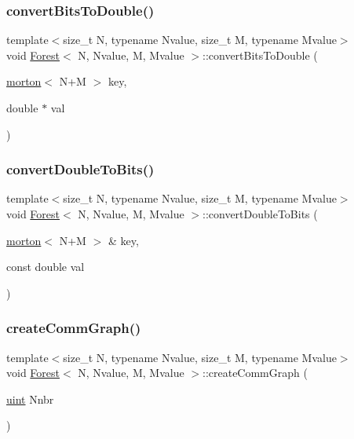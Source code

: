 \mbox{\label{classForest_a37b60e74ca7bb1cdf4ecbb9cc693ce63}} 
\subsubsection{\texorpdfstring{convert\+Bits\+To\+Double()}{convertBitsToDouble()}}
{\footnotesize\ttfamily template$<$size\+\_\+t N, typename Nvalue, size\+\_\+t M, typename Mvalue$>$ \\
void \mbox{\hyperlink{classForest}{Forest}}$<$ N, Nvalue, M, Mvalue $>$\+::convert\+Bits\+To\+Double (\begin{DoxyParamCaption}\item[{\mbox{\hyperlink{definitions_8h_af8682350bd8bb38ee9023f7a0a310add}{morton}}$<$ N+M $>$}]{key,  }\item[{double $\ast$}]{val }\end{DoxyParamCaption})}

\mbox{\label{classForest_a6648461dfcb06501a61872e34a350769}} 
\subsubsection{\texorpdfstring{convert\+Double\+To\+Bits()}{convertDoubleToBits()}}
{\footnotesize\ttfamily template$<$size\+\_\+t N, typename Nvalue, size\+\_\+t M, typename Mvalue$>$ \\
void \mbox{\hyperlink{classForest}{Forest}}$<$ N, Nvalue, M, Mvalue $>$\+::convert\+Double\+To\+Bits (\begin{DoxyParamCaption}\item[{\mbox{\hyperlink{definitions_8h_af8682350bd8bb38ee9023f7a0a310add}{morton}}$<$ N+M $>$ \&}]{key,  }\item[{const double}]{val }\end{DoxyParamCaption})}

\mbox{\label{classForest_a6a12247ec2f9ae36f657c2abf63b9364}} 
\subsubsection{\texorpdfstring{create\+Comm\+Graph()}{createCommGraph()}}
{\footnotesize\ttfamily template$<$size\+\_\+t N, typename Nvalue, size\+\_\+t M, typename Mvalue$>$ \\
void \mbox{\hyperlink{classForest}{Forest}}$<$ N, Nvalue, M, Mvalue $>$\+::create\+Comm\+Graph (\begin{DoxyParamCaption}\item[{\mbox{\hyperlink{definitions_8h_a69aa29b598b851b0640aa225a9e5d61d}{uint}}}]{Nnbr }\end{DoxyParamCaption})}

